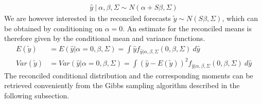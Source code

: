 \documentclass[a4paper,fleqn,11pt]{article}
\begin{document}
\begin{align}
\hat{y}\ |\ \alpha,\beta,\Sigma \sim N(\alpha + S\beta,\Sigma)
\end{align}
We are however interested in the reconciled forecasts $\tilde{y} \sim N(S\beta,\Sigma)$, which can be obtained by conditioning on $\alpha = 0$. An estimate for the reconciled means is therefore given by the conditional mean and variance functions.
\begin{align*}
E(\tilde{y}) &= E(\hat{y}|\alpha = 0,\beta,\Sigma) = \int \hat{y} f_{\hat{y}|\alpha,\beta,\Sigma}(0,\beta,\Sigma)\ d\hat{y} \\
Var(\tilde{y}) &= Var(\hat{y}|\alpha = 0,\beta,\Sigma) =  \int (\hat{y} - E(\tilde{y}))^2 f_{\hat{y}|\alpha,\beta,\Sigma}(0,\beta,\Sigma)\ d\hat{y}
\end{align*}
The reconciled conditional distribution and the corresponding moments can be retrieved conveniently from the Gibbs sampling algorithm described in the following subsection.\\

\clearpage
\end{document}
